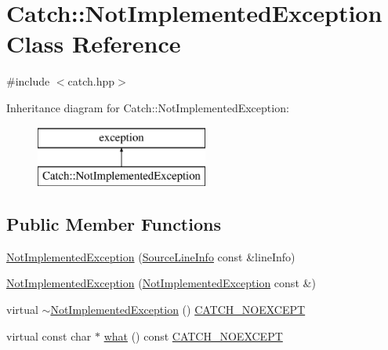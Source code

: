 \hypertarget{class_catch_1_1_not_implemented_exception}{}\section{Catch\+:\+:Not\+Implemented\+Exception Class Reference}
\label{class_catch_1_1_not_implemented_exception}


{\ttfamily \#include $<$catch.\+hpp$>$}

Inheritance diagram for Catch\+:\+:Not\+Implemented\+Exception\+:\begin{figure}[H]
\begin{center}
\leavevmode
\includegraphics[height=2.000000cm]{class_catch_1_1_not_implemented_exception}
\end{center}
\end{figure}
\subsection*{Public Member Functions}
\begin{DoxyCompactItemize}
\item 
\mbox{\hyperlink{class_catch_1_1_not_implemented_exception_ab4f0a5c39d8ffb72c664e2c07e180634}{Not\+Implemented\+Exception}} (\mbox{\hyperlink{struct_catch_1_1_source_line_info}{Source\+Line\+Info}} const \&line\+Info)
\item 
\mbox{\hyperlink{class_catch_1_1_not_implemented_exception_a508a7a833455da2d3c10ea1a9d45e982}{Not\+Implemented\+Exception}} (\mbox{\hyperlink{class_catch_1_1_not_implemented_exception}{Not\+Implemented\+Exception}} const \&)
\item 
virtual \mbox{\hyperlink{class_catch_1_1_not_implemented_exception_a557e7312aaa32c37bded019f2b059bcb}{$\sim$\+Not\+Implemented\+Exception}} () \mbox{\hyperlink{catch_8hpp_a0408e94ca73880d41f38852b68eadb3c}{C\+A\+T\+C\+H\+\_\+\+N\+O\+E\+X\+C\+E\+PT}}
\item 
virtual const char $\ast$ \mbox{\hyperlink{class_catch_1_1_not_implemented_exception_ad4c13963f1a8feacda0cd331adda89e3}{what}} () const \mbox{\hyperlink{catch_8hpp_a0408e94ca73880d41f38852b68eadb3c}{C\+A\+T\+C\+H\+\_\+\+N\+O\+E\+X\+C\+E\+PT}}
\end{DoxyCompactItemize}


